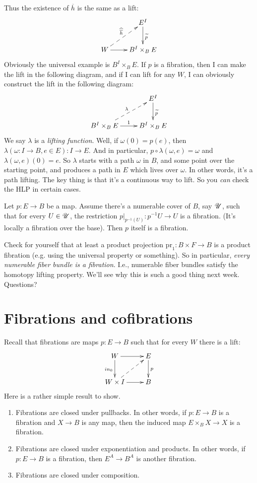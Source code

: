 Thus the existence of $\overline{h}$ is the same as a lift:
\begin{equation*}
    \xymatrix{
	& E^I\ar[d]^{\widetilde{p}}\\
	W\ar[r]\ar@{-->}[ur]^{\widehat{\overline{h}}} & B^I\times_B E
    }
\end{equation*}
Obviously the universal example is $B^I\times_B E$. If $p$ is a fibration, then I can make the lift in the following diagram, and if I can lift for any $W$, I can obviously construct the lift in the following diagram:
\begin{equation*}
    \xymatrix{
	& E^I\ar[d]^{\widetilde{p}}\\
	B^I\times_B E\ar@{-->}[ur]^\lambda\ar[r]^1 & B^I\times_B E
    }
\end{equation*}
We say $\lambda$ is a \emph{lifting function}. Well, if $\omega(0) = p(e)$, then $\lambda(\omega:I\to B, e\in E):I\to E$. And in particular, $p\circ\lambda(\omega, e) = \omega$ and $\lambda(\omega,e)(0) = e$. So $\lambda$ starts with a path $\omega$ in $B$, and some point over the starting point, and produces a path in $E$ which lives over $\omega$. In other words, it's a path lifting. The key thing is that it's a continuous way to lift. So you \emph{can} check the HLP in certain cases.
\begin{theorem}[Dold]
    Let $p:E\to B$ be a map. Assume there's a numerable cover of $B$, say $\mathscr U$, such that for every $U\in\mathscr U$, the restriction $p|_{p^{-1}(U)}:p^{-1}U\to U$ is a fibration. (It's locally a fibration over the base). Then $p$ itself is a fibration.
\end{theorem}
Check for yourself that at least a product projection $\mathrm{pr}_1:B\times F\to B$ is a product fibration (e.g. using the universal property or something). So in particular, \emph{every numerable fiber bundle is a fibration}. I.e., numerable fiber bundles satisfy the homotopy lifting property. We'll see why this is such a good thing next week. Questions?
\section{Fibrations and cofibrations}
Recall that fibrations are maps $p:E\to B$ such that for every $W$ there is a lift:
\begin{equation*}
    \xymatrix{
	W\ar[r]\ar[d]_{in_0} & E\ar[d]^p\\
	W\times I\ar[r]\ar@{-->}[ur] & B
    }
\end{equation*}
Here is a rather simple result to show.
\begin{prop}
    \begin{enumerate}
	\item Fibrations are closed under pullbacks. In other words, if $p:E\to B$ is a fibration and $X\to B$ is any map, then the induced map $E\times_B X\to X$ is a fibration.
	\item Fibrations are closed under exponentiation and products. In other words, if $p:E\to B$ is a fibration, then $E^A\to B^A$ is another fibration.
	\item Fibrations are closed under composition.
    \end{enumerate}
\end{prop}
